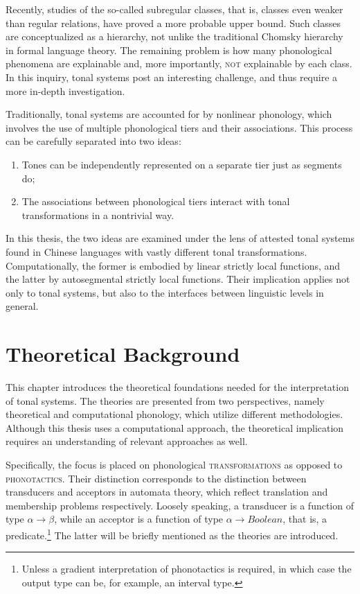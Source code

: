 \documentclass[12pt, a4paper]{report}
\newcommand{\textemph}[1]{\textsc{#1}}
\newcommand{\textterm}[1]{\textsc{#1}\index{#1}}
\begin{document}
Recently, studies of the so-called subregular classes, that is,
classes even weaker than regular relations, have proved a more
probable upper bound.  Such classes are conceptualized as a hierarchy,
not unlike the traditional Chomsky hierarchy in formal language
theory.  The remaining problem is how many phonological phenomena are
explainable and, more importantly, \textemph{not} explainable by each
class.  In this inquiry, tonal systems post an interesting challenge,
and thus require a more in-depth investigation.

Traditionally, tonal systems are accounted for by nonlinear phonology,
which involves the use of multiple phonological tiers and their
associations.  This process can be carefully separated into two ideas:
%
\begin{enumerate}
\item Tones can be independently represented on a separate tier just
  as segments do;
\item The associations between phonological tiers interact with tonal
  transformations in a nontrivial way.
\end{enumerate}
%
In this thesis, the two ideas are examined under the lens of attested
tonal systems found in Chinese languages with vastly different tonal
transformations.  Computationally, the former is embodied by linear
strictly local functions, and the latter by autosegmental strictly
local functions.  Their implication applies not only to tonal systems,
but also to the interfaces between linguistic levels in general.

\tableofcontents

\cleardoublepage
{}

\chapter{Theoretical Background}
This chapter introduces the theoretical foundations needed for the
interpretation of tonal systems.  The theories are presented from two
perspectives, namely theoretical and computational phonology, which
utilize different methodologies.  Although this thesis uses a
computational approach, the theoretical implication requires an
understanding of relevant approaches as well.

Specifically, the focus is placed on phonological
\textterm{transformations} as opposed to \textterm{phonotactics}.
Their distinction corresponds to the distinction between transducers
and acceptors in automata theory, which reflect translation and
membership problems respectively.  Loosely speaking, a transducer is a
function of type \(\alpha \to \beta\), while an acceptor is a function
of type \(\alpha \to \mathit{Boolean}\), that is, a
predicate.\footnote{Unless a gradient interpretation of phonotactics
  is required, in which case the output type can be, for example, an
  interval type.}  The latter will be briefly mentioned as the
theories are introduced.
\end{document}
